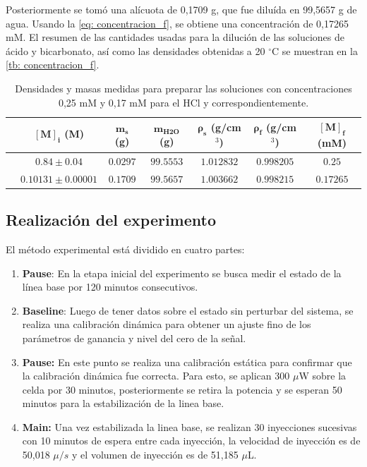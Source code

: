 	Posteriormente se tom\'o una al\'icuota de 0,1709 g, que fue dilu\'ida en 99,5657 g de agua. Usando la \autoref{eq: concentracion_f}, se obtiene una concentraci\'on de 0,17265 mM. El resumen de las cantidades usadas para la diluci\'on de las soluciones de \'acido y bicarbonato, as\'i como las densidades obtenidas a 20 $^\circ$C se muestran en la \autoref{tb: concentracion_f}.
	\begin{table}[h]
		\centering
		\caption{Densidades y masas medidas para preparar las soluciones con concentraciones 0,25 mM y 0,17 mM para el HCl y  correspondientemente.}
		\small
		\begin{tabular}{c|cccccc}
			\hline
			& $\mathbf{[M]_i}$ (M) & $\mathbf{m_s}$ (g) & $\mathbf{m_{\text{H2O}}}$ (g) & $\bm{\rho_s}$ (g/cm$^3$)& $\bm{\rho_f}$ (g/cm$^3$) & $\mathbf{[M]_f}$ (mM) \\
			\hline
			\textbf{\ce{HCl}} & $0.84 \pm 0.04$ & $0.0297$ & $99.5553$ & $1.012832$ & $0.998205$ & $0.25$ \\
			\textbf{\ce{KHCO3}} & $0.10131\pm 0.00001$ & $0.1709$ & $99.5657$ & $1.003662$ & $0.998215$ & $0.17265$ \\
			\hline
		\end{tabular}
		\label{tb: concentracion_f}
	\end{table}
	
	
\subsection{Realizaci\'on del experimento}\label{sec: method}
	El m\'etodo experimental est\'a dividido en cuatro partes:
	\begin{enumerate}
		\item \textbf{Pause}: En la etapa inicial del experimento se busca medir el estado de la línea base por 120 minutos consecutivos.
		\item \textbf{Baseline}: Luego de tener datos sobre el estado sin perturbar del sistema, se realiza una calibración dinámica para obtener un ajuste fino de los parámetros de ganancia y nivel del cero de la señal. 
		\item \textbf{Pause:} En este punto se realiza una calibraci\'on est\'atica para confirmar que la calibraci\'on din\'amica fue correcta. Para esto, se aplican 300 $\mu$W sobre la celda por 30 minutos, posteriormente se retira la potencia y se esperan 50 minutos para la estabilizaci\'on de la linea base.
		\item \textbf{Main:} Una vez estabilizada la linea base, se realizan 30 inyecciones sucesivas con 10 minutos de espera entre cada inyecci\'on, la velocidad de inyecci\'on es de 50,018 $\mu/s$ y el volumen de inyecci\'on es de 51,185 $\mu$L.
	\end{enumerate}

